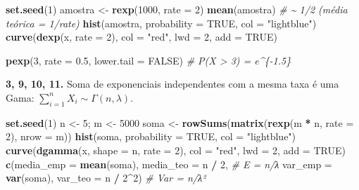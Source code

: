 \documentclass[
  portuguese,
  11pt,
  openany]{book}
\newenvironment{Shaded}{\begin{snugshade}}{\end{snugshade}}
\newcommand{\AttributeTok}[1]{\textcolor[rgb]{0.13,0.29,0.53}{#1}}
\newcommand{\CommentTok}[1]{\textcolor[rgb]{0.56,0.35,0.01}{\textit{#1}}}
\newcommand{\ConstantTok}[1]{\textcolor[rgb]{0.56,0.35,0.01}{#1}}
\newcommand{\DecValTok}[1]{\textcolor[rgb]{0.00,0.00,0.81}{#1}}
\newcommand{\FloatTok}[1]{\textcolor[rgb]{0.00,0.00,0.81}{#1}}
\newcommand{\FunctionTok}[1]{\textcolor[rgb]{0.13,0.29,0.53}{\textbf{#1}}}
\newcommand{\NormalTok}[1]{#1}
\newcommand{\OtherTok}[1]{\textcolor[rgb]{0.56,0.35,0.01}{#1}}
\newcommand{\SpecialCharTok}[1]{\textcolor[rgb]{0.81,0.36,0.00}{\textbf{#1}}}
\newcommand{\StringTok}[1]{\textcolor[rgb]{0.31,0.60,0.02}{#1}}
\begin{document}
\begin{Shaded}
\begin{Highlighting}[]
\FunctionTok{set.seed}\NormalTok{(}\DecValTok{1}\NormalTok{)}
\NormalTok{amostra }\OtherTok{\textless{}{-}} \FunctionTok{rexp}\NormalTok{(}\DecValTok{1000}\NormalTok{, }\AttributeTok{rate =} \DecValTok{2}\NormalTok{)}
\FunctionTok{mean}\NormalTok{(amostra)                       }\CommentTok{\# \textasciitilde{} 1/2 (média teórica = 1/rate)}
\FunctionTok{hist}\NormalTok{(amostra, }\AttributeTok{probability =} \ConstantTok{TRUE}\NormalTok{, }\AttributeTok{col =} \StringTok{"lightblue"}\NormalTok{)}
\FunctionTok{curve}\NormalTok{(}\FunctionTok{dexp}\NormalTok{(x, }\AttributeTok{rate =} \DecValTok{2}\NormalTok{), }\AttributeTok{col =} \StringTok{"red"}\NormalTok{, }\AttributeTok{lwd =} \DecValTok{2}\NormalTok{, }\AttributeTok{add =} \ConstantTok{TRUE}\NormalTok{)}

\FunctionTok{pexp}\NormalTok{(}\DecValTok{3}\NormalTok{, }\AttributeTok{rate =} \FloatTok{0.5}\NormalTok{, }\AttributeTok{lower.tail =} \ConstantTok{FALSE}\NormalTok{)   }\CommentTok{\# P(X \textgreater{} 3) = e\^{}\{{-}1.5\}}
\end{Highlighting}
\end{Shaded}

\textbf{3, 9, 10, 11.} Soma de exponenciais independentes com a mesma taxa é uma Gama:
\(\sum_{i=1}^{n} X_i \sim \Gamma(n, \lambda)\).

\begin{Shaded}
\begin{Highlighting}[]
\FunctionTok{set.seed}\NormalTok{(}\DecValTok{1}\NormalTok{)}
\NormalTok{n }\OtherTok{\textless{}{-}} \DecValTok{5}\NormalTok{; m }\OtherTok{\textless{}{-}} \DecValTok{5000}
\NormalTok{soma }\OtherTok{\textless{}{-}} \FunctionTok{rowSums}\NormalTok{(}\FunctionTok{matrix}\NormalTok{(}\FunctionTok{rexp}\NormalTok{(m }\SpecialCharTok{*}\NormalTok{ n, }\AttributeTok{rate =} \DecValTok{2}\NormalTok{), }\AttributeTok{nrow =}\NormalTok{ m))}
\FunctionTok{hist}\NormalTok{(soma, }\AttributeTok{probability =} \ConstantTok{TRUE}\NormalTok{, }\AttributeTok{col =} \StringTok{"lightblue"}\NormalTok{)}
\FunctionTok{curve}\NormalTok{(}\FunctionTok{dgamma}\NormalTok{(x, }\AttributeTok{shape =}\NormalTok{ n, }\AttributeTok{rate =} \DecValTok{2}\NormalTok{), }\AttributeTok{col =} \StringTok{"red"}\NormalTok{, }\AttributeTok{lwd =} \DecValTok{2}\NormalTok{, }\AttributeTok{add =} \ConstantTok{TRUE}\NormalTok{)}
\FunctionTok{c}\NormalTok{(}\AttributeTok{media\_emp =} \FunctionTok{mean}\NormalTok{(soma), }\AttributeTok{media\_teo =}\NormalTok{ n }\SpecialCharTok{/} \DecValTok{2}\NormalTok{,     }\CommentTok{\# E = n/λ}
  \AttributeTok{var\_emp =} \FunctionTok{var}\NormalTok{(soma),   }\AttributeTok{var\_teo =}\NormalTok{ n }\SpecialCharTok{/} \DecValTok{2}\SpecialCharTok{\^{}}\DecValTok{2}\NormalTok{)       }\CommentTok{\# Var = n/λ²}
\end{Highlighting}
\end{Shaded}
\end{document}
